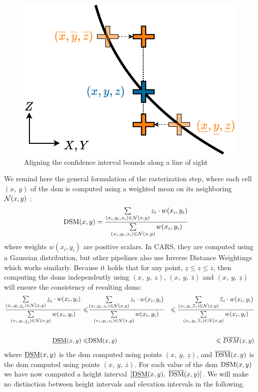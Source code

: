 \begin{figure}
    \centering
    \includegraphics[width=0.6\linewidth]{Images/Chap_6/Planimetric_shift.png}
    \caption{Aligning the confidence interval bounds along a line of sight}
    \label{fig:planimetric_shift}
\end{figure}

We remind here the general formulation of the rasterization step, where each cell $(x,~y)$ of the \acrshort{dsm} is computed using a weighted mean on its neighboring $\mathcal{N}(x,y)$ :
\begin{align}
    \mathrm{DSM}(x,y) &= \dfrac{\sum\limits_{(x_i, y_i, z_i)\in\mathcal{N}(x,y)}z_i\cdot w(x_i, y_i)}{\sum\limits_{(x_i,y_i,z_i)\in\mathcal{N}(x,y)} w(x_i, y_i)}
\end{align}
where weights $w(x_i,y_i)$ are positive scalars. In CARS, they are computed using a Gaussian distribution, but other pipelines also use Inverse Distance Weightings which works similarly. Because it holds that for any point, $\underline{z}\leqslant z\leqslant\overline{z}$, then computing the \acrshort{dsm}s independently using $(x, ~y, ~z)$, $(x, ~y, ~\overline{z})$ and $(x, ~y, ~\underline{z})$ will ensure the consistency of resulting \acrshort{dsm}s:
\begin{eqnarray}
    \dfrac{\sum\limits_{(x_i, y_i, \underline{z}_i)\in\mathcal{N}(x,y)}\underline{z}_i\cdot w(x_i, y_i)}{\sum\limits_{(x_i,y_i, \underline{z}_i)\in\mathcal{N}(x,y)} w(x_i, y_i)}
    \leqslant&
    \dfrac{\sum\limits_{(x_i, y_i, z_i)\in\mathcal{N}(x,y)}z_i\cdot w(x_i, y_i)}{\sum\limits_{(x_i,y_i,z_i)\in\mathcal{N}(x,y)} w(x_i, y_i)}
    &\leqslant
    \dfrac{\sum\limits_{(x_i, y_i, \overline{z}_i)\in\mathcal{N}(x,y)}\overline{z}_i\cdot w(x_i, y_i)}{\sum\limits_{(x_i,y_i,\overline{z}_i)\in\mathcal{N}(x,y)} w(x_i, y_i)}\nonumber\\
    &&\nonumber\\
    \underline{\mathrm{DSM}}(x,y) \leqslant& \mathrm{DSM}(x,y) &\leqslant\overline{DSM}(x,y)
\end{eqnarray}
where $\underline{\mathrm{DSM}}(x,y)$ is the \acrshort{dsm} computed using points $(x, ~y, ~\underline{z})$, and $\overline{\mathrm{DSM}}(x,y)$ is the \acrshort{dsm} computed using points $(x, ~y, ~\overline{z})$. For each value of the \acrshort{dsm} $\mathrm{DSM}(x,y)$ we have now computed a height interval $[\underline{\mathrm{DSM}}(x,y),~\overline{\mathrm{DSM}}(x,y)]$. We will make no distinction between height intervals and elevation intervals in the following. 

